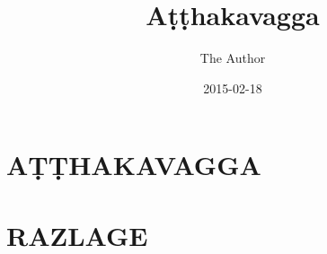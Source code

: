 \documentclass[
  final,
  pagePreset=tallpage,
  babelLanguage=slovene,
]{anecdote}
\title{Aṭṭhakavagga}
\subtitle{}
\author{The Author}
\date{2015-02-18}
\begin{document}
\frontmatter





\cleartorecto
\tableofcontents*



\mainmatter

\cleartorecto
\part{AṬṬHAKAVAGGA}


















\appendix

\cleartorecto

\part{RAZLAGE}



\cleartorecto


\newpage\thispagestyle{empty}\mbox{}
\end{document}
